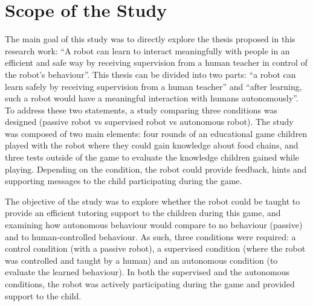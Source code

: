 \section{Scope of the Study} \label{sec:tutoring_scope}

The main goal of this study was to directly explore the thesis proposed in this research work: ``A robot can learn to interact meaningfully with people in an efficient and safe way by receiving supervision from a human teacher in control of the robot's behaviour''. This thesis can be divided into two parts: ``a robot can learn safely by receiving supervision from a human teacher'' and ``after learning, such a robot would have a meaningful interaction with humans autonomously''. To address these two statements, a study comparing three conditions was designed (passive robot vs supervised robot vs autonomous robot). The study was composed of two main elements: four rounds of an educational game children played with the robot where they could gain knowledge about food chains, and three tests outside of the game to evaluate the knowledge children gained while playing. Depending on the condition, the robot could provide feedback, hints and supporting messages to the child participating during the game. 

The objective of the study was to explore whether the robot could be taught to provide an efficient tutoring support to the children during this game, 
and examining how autonomous behaviour would compare to no behaviour (passive) and to human-controlled behaviour. As such, three conditions were required: a control condition (with a passive robot), a supervised condition (where the robot was controlled and taught by a human) and an autonomous condition (to evaluate the learned behaviour). In both the supervised and the autonomous conditions, the robot was actively participating during the game and provided support to the child.

